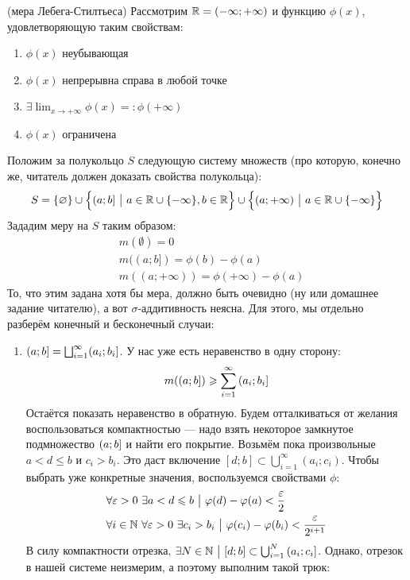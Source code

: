 \begin{example} (мера Лебега-Стилтьеса)
	Рассмотрим $\mathbb{R} = (-\infty; +\infty)$ и функцию $\phi(x)$, удовлетворяющую таким свойствам:
	\begin{enumerate}
		\item $\phi(x)$ неубывающая
		
		\item $\phi(x)$ непрерывна справа в любой точке
		
		\item $\exists \lim_{x \to +\infty} \phi(x) =: \phi(+\infty)$
		
		\item $\phi(x)$ ограничена
	\end{enumerate}
	Положим за полукольцо $S$ следующую систему множеств (про которую, конечно же, читатель должен доказать свойства полукольца):
	\[
		S = \{\varnothing\} \cup \Big\{(a; b] \ \big|\  a \in \mathbb{R} \cup \{-\infty\}, b \in \mathbb{R}\Big\} \cup \Big\{(a; +\infty) \ \big|\  a \in \mathbb{R} \cup \{-\infty\}\Big\}
	\]
	Зададим меру на $S$ таким образом:
	\begin{align*}
		&{m(\emptyset) = 0}
		\\
		&{m((a; b]) = \phi(b) - \phi(a)}
		\\
		&{m((a; +\infty)) = \phi(+\infty) - \phi(a)}
	\end{align*}
	То, что этим задана хотя бы мера, должно быть очевидно (ну или домашнее задание читателю), а вот $\sigma$-аддитивность неясна. Для этого, мы отдельно разберём конечный и бесконечный случаи:
	\begin{enumerate}
		\item $(a; b] = \bigsqcup_{i = 1}^\infty (a_i; b_i]$. У нас уже есть неравенство в одну сторону:
		\[
			m(\left(a; b\right]) \geqslant \sum_{i = 1}^\infty \left(a_i; b_i\right]
		\]
		Остаётся показать неравенство в обратную. Будем отталкиваться от желания воспользоваться компактностью --- надо взять некоторое замкнутое подмножество $\left(a; b\right]$ и найти его покрытие. Возьмём пока произвольные $a < d \le b$ и $c_i > b_i$. Это даст включение $[d; b] \subset \bigcup_{i = 1}^\infty (a_i; c_i)$. Чтобы выбрать уже конкретные значения, воспользуемся свойствами $\phi$:
		\begin{align*}
			&{\forall \varepsilon > 0\ \exists a < d \leqslant b \ \big|\  \varphi(d) - \varphi(a) < \frac{\varepsilon}{2}}
			\\
			&{\forall i \in \mathbb{N}\ \forall \varepsilon > 0\ \exists c_i > b_i \ \big|\  \varphi(c_i) - \varphi(b_i) < \frac{\varepsilon}{2^{i + 1}}}
		\end{align*}
		В силу компактности отрезка, $\exists N \in \mathbb{N} \ \big|\  [d; b] \subset \bigcup_{i = 1}^N \left(a_i; c_i\right]$. Однако, отрезок в нашей системе неизмерим, а поэтому выполним такой трюк:

\end{enumerate}
\end{example}
